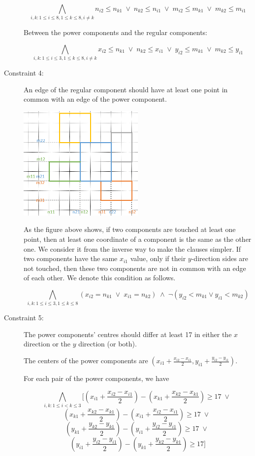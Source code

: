 \documentclass[11pt]{article}
\begin{document}
\begin{description}
  \[  \bigwedge_{i,k: 1 \leq i \leq 8, 1 \leq k \leq 8, i \neq k}
  n_{i2} \leq n_{k1} \; \vee \; n_{k2} \leq n_{i1} \; \vee \; m_{i2} \leq m_{k1} \; \vee \; m_{k2} \leq m_{i1}  \]

  Between the power components and the regular components:

  \[  \bigwedge_{i,k: 1 \leq i \leq 3, 1 \leq k \leq 8, i \neq k}
   x_{i2} \leq n_{k1} \; \vee \; n_{k2} \leq x_{i1} \; \vee \; y_{i2} \leq m_{k1} \; \vee \; m_{k2} \leq y_{i1} \]

  \item[Constraint 4:] An edge of the regular component should have at least one point in common with an edge of the power component.

\begin{center}
\includegraphics[width=0.5\textwidth]{Part1_2_2.png}
\end{center}

  As the figure above shows, if two components are touched at least one point, then at least one coordinate of a component is the same as the other one. We consider it from the inverse way to make the clauses simpler. If two components have the same $x_{i1}$ value, only if their $y$-direction sides are not touched, then these two components are not in common with an edge of each other.
  We denote this condition as follows.

  \[  \bigwedge_{i,k: 1 \leq i \leq 3, 1 \leq k \leq 8}
  (x_{i2} = n_{k1} \; \vee \; x_{i1} = n_{k2}) \; \wedge \;
  \neg (y_{i2} < m_{k1} \vee y_{i1} < m_{k2}) \]
  \item[Constraint 5:] The power components' centres should differ at least 17 in either the $x$ direction or the $y$ direction (or both).

  The centers of the power components are $(x_{i1} + \frac{x_{i2} - x_{i1}}{2}, y_{i1} + \frac{y_{i2} - y_{i1}}{2} )$.

  For each pair of the power components, we have

  \[  \bigwedge_{i,k: 1 \leq i < k \leq 3}
  [ (x_{i1} + \frac{x_{i2} - x_{i1}}{2}) - (x_{k1} + \frac{x_{k2} - x_{k1}}{2}) \geq 17 \; \vee \; \]
  \[ (x_{k1} + \frac{x_{k2} - x_{k1}}{2}) - (x_{i1} + \frac{x_{i2} - x_{i1}}{2}) \geq 17 \; \vee \; \]
  \[ (y_{k1} + \frac{y_{k2} - y_{k1}}{2}) - (y_{i1} + \frac{y_{i2} - y_{i1}}{2}) \geq 17 \; \vee \; \]
  \[ (y_{i1} + \frac{y_{i2} - y_{i1}}{2}) - (y_{k1} + \frac{y_{k2} - y_{k1}}{2}) \geq 17 ] \]


\end{description}
\end{document}
